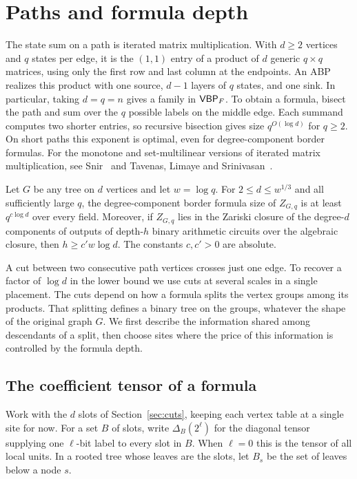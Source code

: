 \section{Paths and formula depth}\label{sec:formula}

The state sum on a path is iterated matrix multiplication. With $d\ge2$
vertices and $q$ states per edge, it is the $(1,1)$ entry of a product
of $d$ generic $q\times q$ matrices, using only the first row and last
column at the endpoints. An ABP realizes this product with one source,
$d-1$ layers of $q$ states, and one sink. In particular, taking $d=q=n$
gives a family in $\mathsf{VBP}_F$. To obtain a formula, bisect the path and sum
over the $q$ possible labels on the middle edge. Each summand computes
two shorter entries, so recursive bisection gives size
$q^{O(\log d)}$ for $q\ge2$. On short paths this exponent is optimal,
even for degree-component border formulas. For the monotone and
set-multilinear versions of iterated matrix multiplication, see
Snir~\cite{Snir} and Tavenas, Limaye and Srinivasan~\cite{LST}.

\begin{theorem}\label{thm:full-flat-graph}
Let $G$ be any tree on $d$ vertices and let $w=\log q$.
For $2\le d\le w^{1/3}$ and all sufficiently large $q$, the
degree-component border formula size of $Z_{G,q}$ is at least
$q^{c\log d}$ over every field. Moreover, if $Z_{G,q}$ lies in the
Zariski closure of the degree-$d$ components of outputs of depth-$h$
binary arithmetic circuits over the algebraic closure, then
$h\ge c' w\log d$. The constants $c,c'>0$ are absolute.
\end{theorem}

A cut between two consecutive path vertices crosses just one edge.
To recover a factor of $\log d$ in the lower bound we use cuts at
several scales in a single placement. The cuts depend on how a
formula splits the vertex groups among its products. That splitting
defines a binary tree on the groups, whatever the shape of the original
graph $G$. We first describe the information shared among descendants
of a split, then choose sites where the price of this information is
controlled by the formula depth.

\subsection{The coefficient tensor of a formula}

Work with the $d$ slots of Section~\ref{sec:cuts}, keeping each
vertex table at a single site for now. For a set $B$ of slots, write
$\Delta_B(2^\ell)$ for the diagonal tensor supplying one $\ell$-bit
label to every slot in $B$. When $\ell=0$ this is the tensor of all
local units. In a rooted tree whose leaves are the slots, let $B_s$
be the set of leaves below a node $s$.

